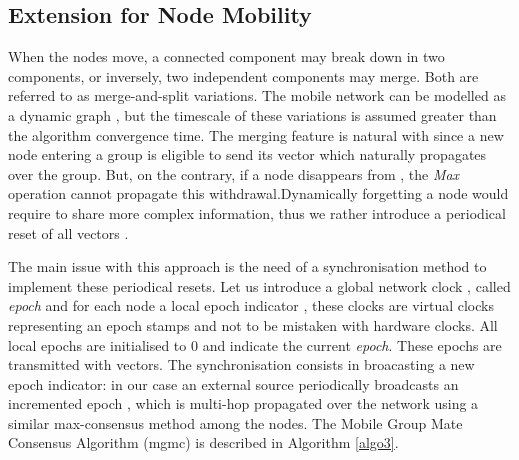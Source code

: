 \documentclass{sig-alternate}
\begin{document}
\newcommand{\mgmc}{\sc mgmc}
\subsection{Extension for Node Mobility }
\label{sec:period}
When the nodes move, a connected component may break down in two components, or inversely, two independent components may merge. Both are referred to as merge-and-split variations. The mobile network can be modelled as a dynamic graph , but the timescale of these variations is assumed greater than the algorithm convergence time.
The merging feature is natural with {\sgc} since a new node entering a group is eligible to send its vector which naturally propagates over the group.
But, on the contrary, if a node disappears from , the \emph{Max} operation cannot propagate this withdrawal.Dynamically forgetting a node would require to share more complex information, thus we rather introduce a periodical reset of all vectors .


The main issue with this approach is the need of a synchronisation method to implement these periodical resets. Let us introduce a global network clock , called {\em epoch} and for each node  a local epoch indicator , these clocks are virtual clocks representing an epoch stamps and not to be mistaken with hardware clocks. All local epochs  are initialised to 0 and indicate the current {\em epoch}. These epochs are transmitted with  vectors. The synchronisation consists in broacasting a new epoch indicator: in our case an external source periodically broadcasts an incremented epoch , which is multi-hop propagated over the network using a similar max-consensus method among the nodes.
The Mobile Group Mate Consensus Algorithm ({\mgmc}) is described in Algorithm \ref{algo3}.
\end{document}
